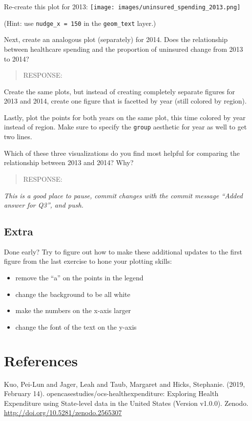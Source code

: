 \documentclass[
]{article}
\providecommand{\tightlist}{%
  \setlength{\itemsep}{0pt}\setlength{\parskip}{0pt}}
\begin{document}
Re-create this plot for 2013:
\texttt{[image: images/uninsured\_spending\_2013.png]}

(Hint: use \texttt{nudge\_x\ =\ 150} in the \texttt{geom\_text} layer.)

Next, create an analogous plot (separately) for 2014. Does the
relationship between healthcare spending and the proportion of uninsured
change from 2013 to 2014?

\begin{quote}
RESPONSE:
\end{quote}

Create the same plots, but instead of creating completely separate
figures for 2013 and 2014, create one figure that is facetted by year
(still colored by region).

Lastly, plot the points for both years on the same plot, this time
colored by year instead of region. Make sure to specify the
\texttt{group} aesthetic for year as well to get two lines.

Which of these three visualizations do you find most helpful for
comparing the relationship between 2013 and 2014? Why?

\begin{quote}
RESPONSE:
\end{quote}

\emph{This is a good place to pause, commit changes with the commit
message ``Added answer for Q3'', and push.}

\hypertarget{extra}{%
\subsection{Extra}\label{extra}}

Done early? Try to figure out how to make these additional updates to
the first figure from the last exercise to hone your plotting skills:

\begin{itemize}
\tightlist
\item
  remove the ``a'' on the points in the legend
\item
  change the background to be all white
\item
  make the numbers on the x-axis larger
\item
  change the font of the text on the y-axis
\end{itemize}

\hypertarget{references}{%
\section{References}\label{references}}

Kuo, Pei-Lun and Jager, Leah and Taub, Margaret and Hicks, Stephanie.
(2019, February 14). opencasestudies/ocs-healthexpenditure: Exploring
Health Expenditure using State-level data in the United States (Version
v1.0.0). Zenodo. \url{http://doi.org/10.5281/zenodo.2565307}
\end{document}
